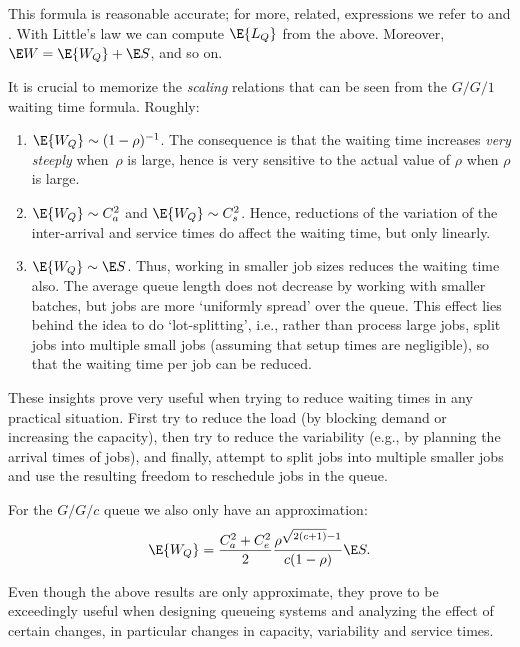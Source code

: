 This formula is reasonable accurate; for more, related, expressions we
refer to \citet{bolch06:_queuein_networ_markov_chain} and
\citet{hall91:_queuein_method_servic_manuf}. With Little's law we can
compute $\E{L_Q}$ from the above. Moreover, $\E W = \E{W_Q} + \E S$,
and so on.


It is crucial to memorize the \emph{scaling} relations that can be
seen from the $G/G/1$ waiting time formula. Roughly:
\begin{enumerate}
\item $\E{W_Q} \sim (1-\rho)^{-1}$. The consequence is that the waiting
  time increases \emph{very steeply} when~$\rho$ is large, hence is
  very sensitive to the actual value of $\rho$ when $\rho$ is large.
\item $\E{W_Q} \sim C_a^2$ and $\E{W_Q} \sim C_s^2$. Hence, reductions
  of the variation of the inter-arrival and service times do affect the
  waiting time, but only linearly.
\item $\E{W_Q} \sim \E S$. Thus, working in smaller job sizes reduces
  the waiting time also. The average queue length does not decrease by
  working with smaller batches, but jobs are more `uniformly spread'
  over the queue. This effect lies behind the idea to do
  `lot-splitting', i.e., rather than process large jobs, split jobs
  into multiple small jobs (assuming that setup times are negligible),
  so that the waiting time per job can be reduced.
\end{enumerate}

These insights prove very useful when trying to reduce waiting times
in any practical situation. First try to reduce the load (by blocking
demand or increasing the capacity), then try to reduce the variability
(e.g., by planning the arrival times of jobs), and finally, attempt to
split jobs into multiple smaller jobs and use the resulting freedom to
reschedule jobs in the queue.

For the $G/G/c$ queue we also only have an approximation: 
\begin{equation}\label{eq:7}
  \E{W_Q} = \frac{C_a^2+C_e^2}2 \frac{\rho^{\sqrt{2(c+1)}-1}}{c(1-\rho)} \E S.
\end{equation}

Even though the above results are only approximate, they prove to be
exceedingly useful when designing queueing systems and analyzing the
effect of certain changes, in particular  changes in capacity,
variability and service times.


